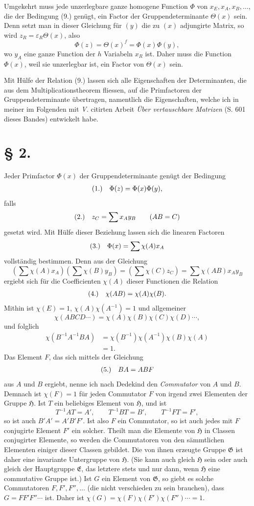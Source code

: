 \documentclass[11pt]{article}
\makeatletter
\newcommand{\Hgrp}{\mathfrak{H}}
\newcommand{\Ggrp}{\mathfrak{G}}
\newcommand{\Egrp}{\mathfrak{E}}
\newcommand{\frobtagc}[2]{\[\begin{array}{@{}r@{\quad}c@{}}\textup{(#1)} & \displaystyle #2\end{array}\]}
\makeatother
\begin{document}
Umgekehrt muss jede unzerlegbare ganze homogene Function $\Phi$ von $x_E,x_A,x_B,\ldots$, die der Bedingung (9.) genügt, ein Factor der Gruppendeterminante $\Theta(x)$ sein. Denn setzt man in dieser Gleichung für $(y)$ die zu $(x)$ adjungirte Matrix, so wird $z_R=\varepsilon_R\Theta(x)$, also
\[
\Phi(z)=\Theta(x)^f=\Phi(x)\Phi(y),
\]
wo $y_A$ eine ganze Function der $h$ Variabeln $x_R$ ist. Daher muss die Function $\Phi(x)$, weil sie unzerlegbar ist, ein Factor von $\Theta(x)$ sein.

Mit Hülfe der Relation (9.) lassen sich alle Eigenschaften der Determinanten, die aus dem Multiplicationstheorem fliessen, auf die Primfactoren der Gruppendeterminante übertragen, namentlich die Eigenschaften, welche ich in meiner im Folgenden mit \emph{V.} citirten Arbeit \emph{Über vertauschbare Matrizen} (S. 601 dieses Bandes) entwickelt habe.

\section*{§ 2.}

Jeder Primfactor $\Phi(x)$ der Gruppendeterminante genügt der Bedingung
\frobtagc{1.}{\Phi(z)=\Phi(x)\Phi(y),}
falls
\frobtagc{2.}{z_C=\sum x_Ay_B\qquad (AB=C)}
gesetzt wird. Mit Hülfe dieser Beziehung lassen sich die linearen Factoren
\frobtagc{3.}{\Phi(x)=\sum\chi(A)x_A}
vollständig bestimmen. Denn aus der Gleichung
\[
\left(\sum\chi(A)x_A\right)\left(\sum\chi(B)y_B\right)=\left(\sum\chi(C)z_C\right)=\sum\chi(AB)x_Ay_B
\]
ergiebt sich für die Coefficienten $\chi(A)$ dieser Functionen die Relation
\frobtagc{4.}{\chi(AB)=\chi(A)\chi(B).}
Mithin ist $\chi(E)=1$, $\chi(A)\chi(A^{-1})=1$ und allgemeiner
\[
\chi(ABCD\cdots)=\chi(A)\chi(B)\chi(C)\chi(D)\cdots,
\]
und folglich
\[
\begin{aligned}
\chi(B^{-1}A^{-1}BA)
&=\chi(B^{-1})\chi(A^{-1})\chi(B)\chi(A)\\
&=1.
\end{aligned}
\]
Das Element $F$, das sich mittels der Gleichung
\frobtagc{5.}{BA=ABF}
aus $A$ und $B$ ergiebt, nenne ich nach Dedekind den \emph{Commutator} von $A$ und $B$. Demnach ist $\chi(F)=1$ für jeden Commutator $F$ von irgend zwei Elementen der Gruppe $\Hgrp$. Ist $T$ ein beliebiges Element von $\Hgrp$, und ist
\[
T^{-1}AT=A',\qquad T^{-1}BT=B',\qquad T^{-1}FT=F',
\]
so ist auch $B'A'=A'B'F'$. Ist also $F$ ein Commutator, so ist auch jedes mit $F$ conjugirte Element $F'$ ein solcher. Theilt man die Elemente von $\Hgrp$ in Classen conjugirter Elemente, so werden die Commutatoren von den sämmtlichen Elementen einiger dieser Classen gebildet. Die von ihnen erzeugte Gruppe $\Ggrp$ ist daher eine invariante Untergruppe von $\Hgrp$. (Sie kann auch gleich $\Hgrp$ sein oder auch gleich der Hauptgruppe $\Egrp$, das letztere stets und nur dann, wenn $\Hgrp$ eine commutative Gruppe ist.) Ist $G$ ein Element von $\Ggrp$, so giebt es solche Commutatoren $F,F',F'',\ldots$ (die nicht verschieden zu sein brauchen), dass $G=FF'F''\cdots$ ist. Daher ist $\chi(G)=\chi(F)\chi(F')\chi(F'')\cdots=1$.
\end{document}
